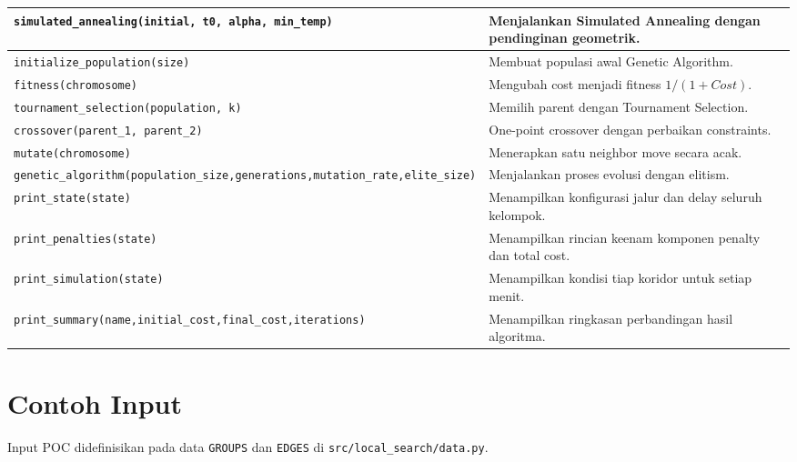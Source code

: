 \documentclass[11pt,a4paper]{article}
\begin{document}
{\begin{tabularx}{\textwidth}{|>{\raggedright\arraybackslash}p{6.5cm}|>{\raggedright\arraybackslash}X|}
\hline
\texttt{simulated\_annealing(initial, t0, alpha, min\_temp)} & Menjalankan Simulated Annealing dengan pendinginan geometrik. \\
\hline
\texttt{initialize\_population(size)} & Membuat populasi awal Genetic Algorithm. \\
\hline
\texttt{fitness(chromosome)} & Mengubah cost menjadi fitness $1/(1+Cost)$. \\
\hline
\texttt{tournament\_selection(population, k)} & Memilih parent dengan Tournament Selection. \\
\hline
\texttt{crossover(parent\_1, parent\_2)} & One-point crossover dengan perbaikan constraints. \\
\hline
\texttt{mutate(chromosome)} & Menerapkan satu neighbor move secara acak. \\
\hline
\texttt{genetic\_algorithm(\allowbreak population\_size,\allowbreak generations,\allowbreak mutation\_rate,\allowbreak elite\_size)} & Menjalankan proses evolusi dengan elitism. \\
\hline
\texttt{print\_state(state)} & Menampilkan konfigurasi jalur dan delay seluruh kelompok. \\
\hline
\texttt{print\_penalties(state)} & Menampilkan rincian keenam komponen penalty dan total cost. \\
\hline
\texttt{print\_simulation(state)} & Menampilkan kondisi tiap koridor untuk setiap menit. \\
\hline
\texttt{print\_summary(name,\allowbreak initial\_cost,\allowbreak final\_cost,\allowbreak iterations)} & Menampilkan ringkasan perbandingan hasil algoritma. \\
\hline
\end{tabularx}}

\section{Contoh Input}

Input POC didefinisikan pada data \texttt{GROUPS} dan \texttt{EDGES} di \texttt{src/local\_search/data.py}.
\end{document}
